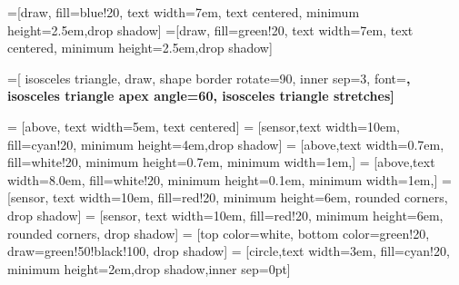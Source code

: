 \documentclass{article}
\begin{document}


=[draw, fill=blue!20, text width=7em, 
    text centered, minimum height=2.5em,drop shadow]
	=[draw, fill=green!20, text width=7em, 
    text centered, minimum height=2.5em,drop shadow]
	
	
=[
   isosceles triangle,  
   draw, 
   shape border rotate=90, 
   inner sep=3, 
   font=\small\sffamily\bfseries,
   isosceles triangle apex angle=60,
   isosceles triangle stretches]

 = [above, text width=5em, text centered]
 = [sensor,text width=10em, fill=cyan!20, 
    minimum height=4em,drop shadow]
	 = [above,text width=0.7em, fill=white!20, 
    minimum height=0.7em, minimum width=1em,]
	 = [above,text width=8.0em, fill=white!20, 
    minimum height=0.1em, minimum width=1em,]
 = [sensor, text width=10em, fill=red!20, 
    minimum height=6em, rounded corners, drop shadow]
 = [sensor, text width=10em, fill=red!20, 
    minimum height=6em, rounded corners, drop shadow]
 = [top color=white, bottom color=green!20, 
                         draw=green!50!black!100, drop shadow]
 = [circle,text width=3em, fill=cyan!20, 
    minimum height=2em,drop shadow,inner sep=0pt]

\def\blockdist{2.3}
\def\edgedist{2.5}
\end{document}
